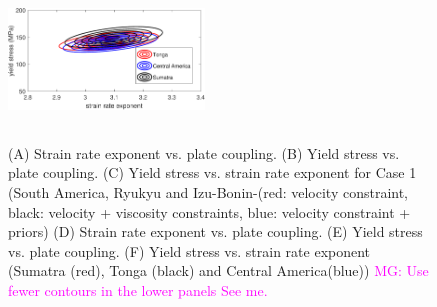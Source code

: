 \documentclass[12pt]{article}
\newcommand{\mgnote}[1]{\textcolor{magenta}{MG: #1}}
\begin{document}
{\begin{figure}[H]
{\includegraphics[height=35mm,width=52mm]{fig3new.pdf}%
}
\caption{(A) Strain rate exponent vs. plate coupling. 
(B) Yield stress vs. plate coupling. 
(C) Yield stress vs. strain rate exponent for Case 1 (South America, Ryukyu and Izu-Bonin-(red: velocity constraint, black: velocity + viscosity constraints, blue: velocity constraint + priors) 
(D) Strain rate exponent vs. plate coupling. 
(E) Yield stress vs. plate coupling. 
(F) Yield stress vs. strain rate exponent  (Sumatra (red), Tonga (black) and Central America(blue))
\mgnote{Use fewer contours in the lower panels See me.}}
\label{fig:distrib}
\end{figure}


}
\end{document}
